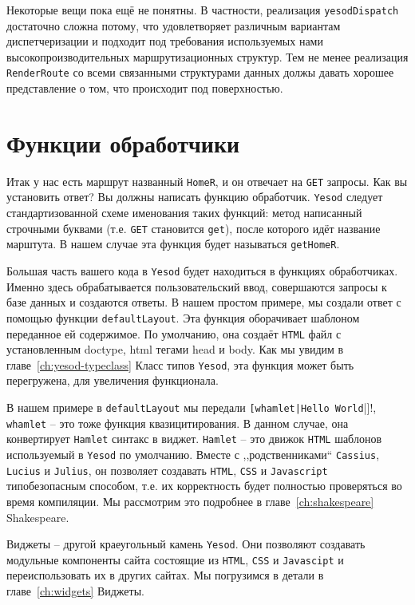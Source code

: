 Некоторые вещи пока ещё не понятны. В частности, реализация \lstinline!yesodDispatch!
достаточно сложна потому, что удовлетворяет различным вариантам диспетчеризации
и подходит под требования используемых нами высокопроизводительных 
маршрутизационных структур.
Тем не менее реализация \lstinline!RenderRoute! со всеми связанными 
структурами данных должы давать хорошее представление о том, что происходит 
под поверхностью. %

\section{Функции обработчики}

Итак у нас есть маршрут названный \lstinline!HomeR!, и он отвечает на \texttt{GET} запросы. 
Как вы установить ответ? Вы должны написать функцию обработчик. \texttt{Yesod} следует
стандартизованной схеме именования таких функций: 
метод написанный строчными буквами (т.е. \texttt{GET} становится \lstinline!get!), после которого идёт 
название марштута. В нашем случае эта функция будет называться \lstinline!getHomeR!.

Большая часть вашего кода в \texttt{Yesod} будет находиться в функциях обработчиках. 
Именно здесь обрабатывается пользовательский ввод, совершаются запросы к базе данных и создаются ответы. 
В нашем простом примере, мы создали ответ с помощью функции \lstinline!defaultLayout!. 
Эта функция оборачивает шаблоном переданное ей содержимое.  По умолчанию, 
она создаёт \texttt{HTML} файл с установленным doctype, html тегами head и body. 
Как мы увидим в главе~\ref{ch:yesod-typeclass} Класс типов \texttt{Yesod}, 
эта функция может быть перегружена, для увеличения функционала.

В нашем примере в \lstinline!defaultLayout! мы передали 
\lstinline![whamlet|Hello World!|]!, \lstinline!whamlet! -- это тоже 
функция квазицитирования. В данном случае, она конвертирует 
\texttt{Hamlet} синтакс в виджет. \texttt{Hamlet} -- это движок 
\texttt{HTML} шаблонов используемый в \texttt{Yesod} по умолчанию. 
Вместе с ,,родственниками`` \texttt{Cassius}, \texttt{Lucius} 
и \texttt{Julius}, он позволяет создавать \texttt{HTML}, \texttt{CSS}
и \texttt{Javascript} типобезопасным способом, т.е. их корректность будет 
полностью проверяться во время компиляции. Мы рассмотрим это подробнее в 
главе~\ref{ch:shakespeare} Shakespeare.

Виджеты -- другой краеугольный камень \texttt{Yesod}. Они позволяют создавать 
модульные компоненты сайта состоящие из \texttt{HTML}, \texttt{CSS} и 
\texttt{Javascipt} и переиспользовать их в других сайтах. 
Мы погрузимся в детали в главе~\ref{ch:widgets} Виджеты.

